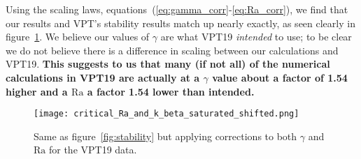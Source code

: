 \documentclass[11pt]{article}
\begin{document}
Using the scaling laws, equations~(\ref{eq:gamma_corr}-\ref{eq:Ra_corr}), we find that our results and VPT's stability results match up nearly exactly, as seen clearly in figure~\ref{fig:stability_corrected}. We believe our values of $\gamma$ are what VPT19 \emph{intended} to use; to be clear we do not believe there is a difference in scaling between our calculations and VPT19. \textbf{This suggests to us that many (if not all) of the numerical calculations in VPT19 are actually at a $\gamma$ value about a factor of 1.54 higher and a $\mathrm{Ra}$ a factor 1.54 lower than intended.}

\begin{figure}[!h]
  \centering
  \texttt{[image: critical\_Ra\_and\_k\_beta\_saturated\_shifted.png]}
  \caption{Same as figure~\ref{fig:stability} but applying corrections to both $\gamma$ and $\mathrm{Ra}$ for the VPT19 data.}
  \label{fig:stability_corrected}
\end{figure}

\end{document}
